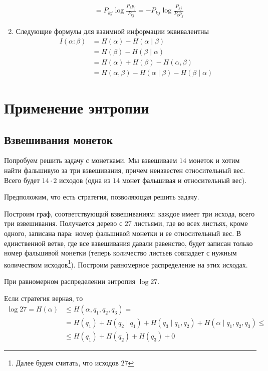 \begin{prop}
\begin{enumerate}
\begin{proof*}
\begin{align*}
		        \tag{по неравенству Йенсена} \\
		        &= P_{kj} \log \frac{P_k p_j}{P_{kj}} 
		        = -P_{kj} \log \frac{P_{kj}}{P_k p_j}
		    \end{align*}
		\end{proof*}
		\item  Следующие формулы для взаимной информации эквивалентны
			\begin{align*}
				I( \alpha : \beta ) 
				&= H( \alpha) - H( \alpha  \mid \beta  ) \\
				&= H( \beta ) - H( \beta \mid \alpha ) \\
				&= H\left( \alpha  \right) + H( \beta ) - H( \alpha , \beta ) \\
			    &= H( \alpha , \beta ) - H( \alpha \mid \beta ) - H( \beta \mid \alpha )
			\end{align*}
	\end{enumerate}
\end{prop}

\section{Применение энтропии}
\subsection{Взвешивания монеток}
Попробуем решить задачу с монетками. Мы взвешиваем $ 14$ монеток и хотим найти фальшивую за три взвешивания, причем неизвестен относительный вес. Всего будет $14 \cdot 2$ исходов (одна из $14$ монет фальшивая и относительный вес).

Предположим, что есть стратегия, позволяющая решить задачу.

Построим граф, соответствующий взвешиваниям: каждое имеет три исхода, всего три взвешивания. Получается дерево с $27$ листьями, где во всех листьях, кроме одного, записана пара:
номер фальшивой монетки и ее относительный вес.
В единственной ветке, где все взвешивания давали равенство, будет записан только номер фальшивой монетки (теперь количество листьев совпадает с нужным количеством исходов\footnote{Далее будем считать, что исходов $27$}).
Построим равномерное распределение на этих исходах.

При равномерном распределении энтропия $ \log 27$.

Если стратегия верная, то
\begin{align*}
\log 27 = H(\alpha) &\le  H( \alpha, q_1, q_2, q_3) = \\ &= H( q_1 ) + H(q_{2} \mid q_1 )+ H(q_3 \mid q_1, q_2)+ H( \alpha  \mid q_1, q_2, q_3 ) \le \tag{Chain rule}\\  
			& \le  H(q_1) + H(q_2) + H(q_3) + 0
\end{align*}

